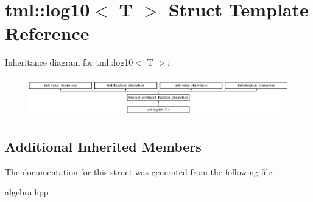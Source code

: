 \hypertarget{structtml_1_1log10}{\section{tml\+:\+:log10$<$ T $>$ Struct Template Reference}
\label{structtml_1_1log10}
}
Inheritance diagram for tml\+:\+:log10$<$ T $>$\+:\begin{figure}[H]
\begin{center}
\leavevmode
\includegraphics[height=1.750000cm]{structtml_1_1log10}
\end{center}
\end{figure}
\subsection*{Additional Inherited Members}


The documentation for this struct was generated from the following file\+:\begin{DoxyCompactItemize}
\item 
algebra.\+hpp\end{DoxyCompactItemize}
